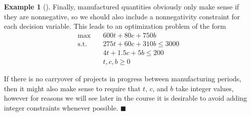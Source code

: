 \documentclass[11pt]{article}
\theoremstyle{definition} %
\newtheorem{ex}{Example}[section] %
\newenvironment{example}[1][]{\begin{ex}[#1]}{\hfill$\blacksquare$\end{ex}} %
\begin{document}
\begin{example}
	Finally, manufactured quantities obviously only make sense if they are nonnegative, so we should also include a nonnegativity constraint for each decision variable. This leads to an optimization problem of the form
	\begin{align*}
		\tag{maximize total revenue} \max \quad& 600t + 80c + 750b \\
		\tag{wood limitations} \mathrm{s.t.} \quad& 275t + 60c + 310b \le 3000 \\
		\tag{labor limitations} & 4t + 1.5c + 5b \le 200 \\
		\tag{nonnegativity} & t,c,b \ge 0
	\end{align*}
	
	If there is no carryover of projects in progress between manufacturing periods, then it might also make sense to require that $t$, $c$, and $b$ take integer values, however for reasons we will see later in the course it is desirable to avoid adding integer constraints whenever possible.
\end{example}
\end{document}
